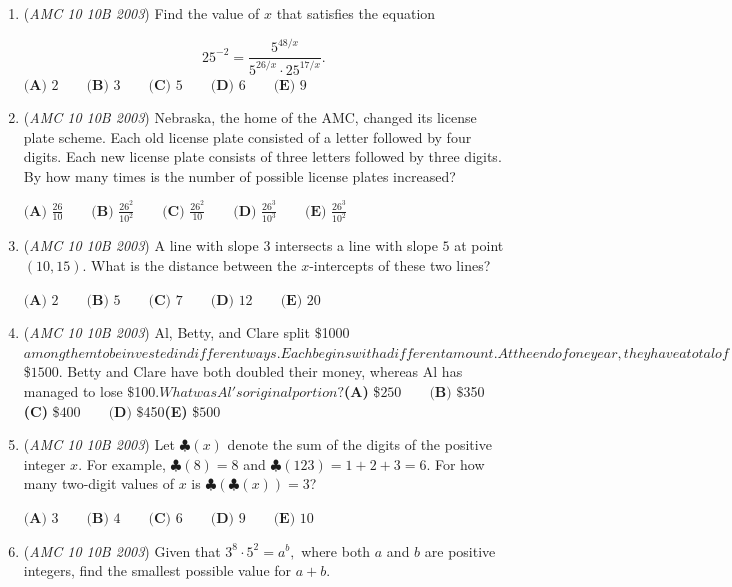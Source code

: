 \begin{enumerate}
	\item (\textit{AMC 10 10B 2003}) Find the value of $x$ that satisfies the equation

 \[25^{-2} = \frac{5^{48/x}}{5^{26/x} \cdot 25^{17/x}}.\]
$\textbf{(A) } 2 \qquad\textbf{(B) } 3 \qquad\textbf{(C) } 5 \qquad\textbf{(D) } 6 \qquad\textbf{(E) } 9$


	\item (\textit{AMC 10 10B 2003}) Nebraska, the home of the AMC, changed its license plate scheme. Each old license plate consisted of a letter followed by four digits. Each new license plate consists of three letters followed by three digits. By how many times is the number of possible license plates increased?


 $\textbf{(A) } \frac{26}{10} \qquad\textbf{(B) } \frac{26^2}{10^2} \qquad\textbf{(C) } \frac{26^2}{10} \qquad\textbf{(D) } \frac{26^3}{10^3} \qquad\textbf{(E) } \frac{26^3}{10^2}$


	\item (\textit{AMC 10 10B 2003}) A line with slope $3$ intersects a line with slope $5$ at point  $(10,15)$. What is the distance between the $x$-intercepts of these two lines?


 $\textbf{(A) } 2 \qquad\textbf{(B) } 5 \qquad\textbf{(C) } 7 \qquad\textbf{(D) } 12 \qquad\textbf{(E) } 20$


	\item (\textit{AMC 10 10B 2003}) Al, Betty, and Clare split $\$$1000$ among them to be invested in different ways. Each begins with a different amount. At the end of one year, they have a total of $\$$1500$. Betty and Clare have both doubled their money, whereas Al has managed to lose $\$$100$. What was Al's original portion?


 $\textbf{(A) }\$$250 \qquad\textbf{(B) }\$ $350 \qquad\textbf{(C) }\$$400\qquad\textbf{(D) }\$ $450\qquad\textbf{(E) }\$$500$


	\item (\textit{AMC 10 10B 2003}) Let $\clubsuit(x)$ denote the sum of the digits of the positive integer $x$. For example, $\clubsuit(8)=8$ and $\clubsuit(123)=1+2+3=6$. For how many two-digit values of $x$ is $\clubsuit(\clubsuit(x))=3$?


 $\textbf{(A) } 3 \qquad\textbf{(B) } 4 \qquad\textbf{(C) } 6 \qquad\textbf{(D) } 9 \qquad\textbf{(E) } 10$


	\item (\textit{AMC 10 10B 2003}) Given that $3^8\cdot5^2=a^b,$ where both $a$ and $b$ are positive integers, find the smallest possible value for $a+b$.



\end{enumerate}
